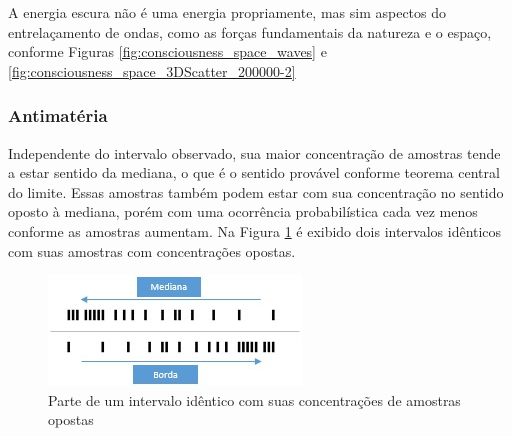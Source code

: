A energia escura não é uma energia propriamente, mas sim aspectos do entrelaçamento de ondas, como as forças fundamentais da natureza e o espaço, conforme Figuras \ref{fig:consciousness_space_waves} e \ref{fig:consciousness_space_3DScatter_200000-2}

\subsubsection{Antimatéria}
Independente do intervalo observado, sua maior concentração de amostras tende a estar sentido da mediana, o que é o sentido provável conforme teorema central do limite. Essas amostras também podem estar com sua concentração no sentido oposto à mediana, porém com uma ocorrência probabilística cada vez menos conforme as amostras aumentam. Na Figura \ref{fig:consciousness_concentration_of_opposite_samples} é exibido dois intervalos idênticos com suas amostras com concentrações opostas.
\begin{figure}[H]
\caption{Parte de um intervalo idêntico com suas concentrações de amostras opostas}
\label{fig:consciousness_concentration_of_opposite_samples}
\centering
\includegraphics[scale=1]{sections/images/consciousness_concentration_of_opposite_samples.jpg}
\end{figure}

